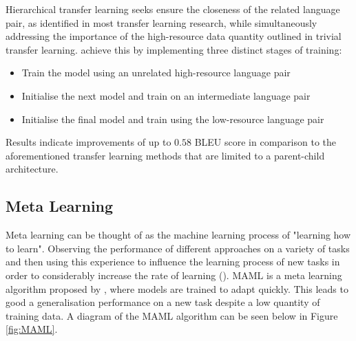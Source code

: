 Hierarchical transfer learning seeks ensure the closeness of the related language pair, as identified in most transfer learning research, while simultaneously addressing the importance of the high-resource data quantity outlined in trivial transfer learning. \cite{luo_hierarchical_2019} achieve this by implementing three distinct stages of training:

\begin{itemize}
  \item Train the model using an unrelated high-resource language pair
  \item Initialise the next model and train on an intermediate language pair
  \item Initialise the final model and train using the low-resource language pair
\end{itemize}

Results indicate improvements of up to $0.58$ \acrshort{BLEU} score in comparison to the aforementioned transfer learning methods that are limited to a parent-child architecture.




\subsection{Meta Learning}

Meta learning can be thought of as the machine learning process of "learning how to learn". Observing the performance of different approaches on a variety of tasks and then using this experience to influence the learning process of new tasks in order to considerably increase the rate of learning (\cite{vanschoren_meta-learning:_2018}).
\acrfull{MAML} is a meta learning algorithm proposed by \cite{finn_model-agnostic_2017}, where models are trained to adapt quickly. This leads to good a generalisation performance on a new task despite a low quantity of training data.
A diagram of the \acrshort{MAML} algorithm can be seen below in Figure \ref{fig:MAML}.

